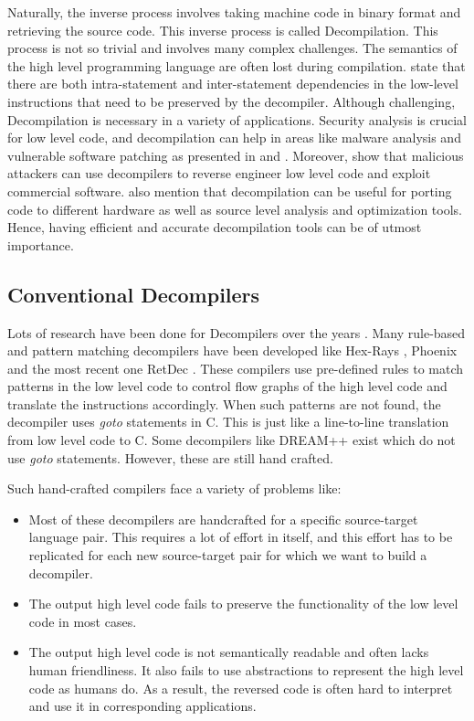 \documentclass{article}
\begin{document}
Naturally, the inverse process involves taking machine code in binary format and retrieving the source code. This inverse process is called Decompilation. This process is not so trivial and involves many complex challenges. The semantics of the high level programming language are often lost during compilation. \citet{coda} state that there are both intra-statement and inter-statement dependencies in the low-level instructions that need to be preserved by the decompiler. Although challenging, Decompilation is necessary in a variety of applications. Security analysis is crucial for low level code, and decompilation can help in areas like malware analysis and vulnerable software patching as presented in \citet{kolbitsch2009effective} and \citet{yakdan2016helping}. Moreover, \citet{lee2011tie} show that malicious attackers can use decompilers to reverse engineer low level code and exploit commercial software. \citet{katz2019towards} also mention that decompilation can be useful for porting code to different hardware as well as source level analysis and optimization tools. Hence, having efficient and accurate decompilation tools can be of utmost importance.

\subsection{Conventional Decompilers}
Lots of research have been done for Decompilers over the years \cite{cifuentes1994reverse, emmerik2004using,brumley2011bap,bao2014byteweight,rosenblum2008learning,yakdan2016helping,brumley2013native}. Many rule-based and pattern matching decompilers have been developed like Hex-Rays \cite{hexray}, Phoenix \cite{brumley2013native} and the most recent one RetDec \cite{kvroustek2017retdec}. These compilers use pre-defined rules to match patterns in the low level code to control flow graphs of the high level code and translate the instructions accordingly. When such patterns are not found, the decompiler uses \textit{goto} statements in C. This is just like a line-to-line translation from low level code to C. Some decompilers like DREAM++ \cite{yakdan2015no,yakdan2016helping} exist which do not use \textit{goto} statements. However, these are still hand crafted.

Such hand-crafted compilers face a variety of problems like:
\begin{itemize}
    \item Most of these decompilers are handcrafted for a specific source-target language pair. This requires a lot of effort in itself, and this effort has to be replicated for each new source-target pair for which we want to build a decompiler.
    \item The output high level code fails to preserve the functionality of the low level code in most cases.
    \item The output high level code is not semantically readable and often lacks human friendliness. It also fails to use abstractions to represent the high level code as humans do. As a result, the reversed code is often hard to interpret and use it in corresponding applications.
\end{itemize}
\end{document}
